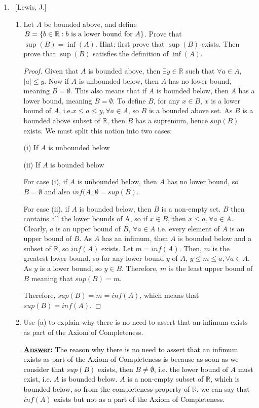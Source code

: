 \documentclass[10pt]{article}
\begin{document}
\begin{enumerate}
\item ~[Lewis, J.] 

	\begin{enumerate}
	
	\item  Let $A$ be bounded above, and define $B = \{b \in \mathbb{R}: b \textnormal{ is a lower bound for } A\}$.  Prove that $\sup{(B)} = \inf{(A)}$.  Hint: first prove that $\sup{(B)}$ exists.  Then prove that $\sup{(B)}$ satisfies the definition of $\inf{(A)}$.
	 \begin{proof}
Given that $A$ is bounded above, then $\exists y \in \mathbb{R}$ such that $\forall a \in A$, $|a| \leq y$.  Now if $A$ is unbounded below, then $A$ has no lower bound, meaning $B = \emptyset$.  This also means that if $A$ is bounded below, then $A$ has a lower bound, meaning $B = \emptyset$.  To define $B$, for any $x \in B$, $x$ is a lower bound of $A$, i.e.$x \leq a \leq y, \forall a \in A$, so $B$ is a bounded above set.  As $B$ is a bounded above subset of $\mathbb{R}$, then $B$ has a supremum, hence $sup(B)$ exists.  We must split this notion into two cases:
\begin{center}
(i) If $A$ is unbounded below

(ii) If $A$ is bounded below
\end{center}
For case (i), if $A$ is unbounded below, then $A$ has no lower bound, so $B = \emptyset$ and also $inf(A_ = \emptyset = sup(B)$.

For case (ii), if $A$ is bounded below, then $B$ is a non-empty set.  $B$ then contains all the lower bounds of A, so if $x \in B$, then $x \leq a, \forall a \in A$.  Clearly, $a$ is an upper bound of $B$, $\forall a \in A$ i.e. every element of $A$ is an upper bound of $B$.  As $A$ has an infimum, then $A$ is bounded below and a subset of $\mathbb{R}$, so $inf(A)$ exists.  Let $m = inf(A)$.  Then, $m$ is the greatest lower bound, so for any lower bound $y$ of $A$, $y \leq m \leq a, \forall a \in A$.  As $y$ is a lower bound, so $y \in B$. Therefore, $m$ is the least upper bound of $B$ meaning that $sup(B) = m$.

Therefore, $sup(B) = m = inf(A)$, which means that $sup(B) = inf(A)$.
 \end{proof}	
 
	\item  Use (a) to explain why there is no need to assert that an infimum exists as part of the Axiom of Completeness.
\par \medskip
	\textbf{\textcolor{black}{\underline{Answer}:}}
\textcolor{black}{The reason why there is no need to assert that an infimum exists as part of the Axiom of Completeness is because as soon as we consider that $sup(B)$ exists, then $B \neq \emptyset$, i.e. the lower bound of $A$ must exist, i.e. $A$ is bounded below.  $A$ is a non-empty subset of $\mathbb{R}$, which is bounded below, so from the completeness property of $\mathbb{R}$, we can say that $inf(A)$ exists but not as a part of the Axiom of Completeness. }
	\end{enumerate}

\end{enumerate}
\end{document}
